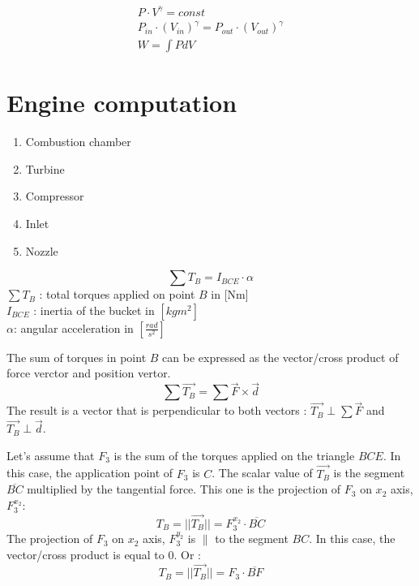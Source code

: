 \documentclass[12pt,a4paper]{article}
\begin{document}
	\begin{eqnarray}
		P \cdot V^{\gamma} = const\\
		P_{in} \cdot (V_{in})^{\gamma} = P_{out} \cdot (V_{out})^{\gamma}\\
		W =\int P dV
	\end{eqnarray}
	
	\section{Engine computation}
	\begin{enumerate}
		\item Combustion chamber
		\item Turbine
		\item Compressor
		\item Inlet
		\item Nozzle
	\end{enumerate}

	
		 
	\newpage
	\begin{equation}
		\sum T_B = I_{BCE} \cdot \alpha
	\end{equation}
	$\sum T_B$ : total torques applied on point $B$ in [Nm]\\
	$I_{BCE}$ : inertia of the bucket in $[kg m^2]$\\
	$\alpha$: angular acceleration in $[\frac{rad}{s^2}] $
	
	The sum of torques in point $B$ can be expressed as the vector/cross product of force verctor and position vertor. 
	\begin{equation}
		\sum \vec{T_B} = \sum \vec{F} \times \vec{d}
	\end{equation}
	The result is a vector that is perpendicular to both vectors : 
	$\vec{T_B} \perp \sum \vec{F}$ and 
	$\vec{T_B} \perp \vec{d}$.
	
	Let's assume that $F_3$ is the sum of the torques applied on the triangle $BCE$. In this case, the application point of $F_3$ is $C$. The scalar value of $\vec{T_B}$ is  the segment $\overline{BC}$ multiplied by the tangential force. This one is the projection of $F_3$ on $x_2$ axis, $F_3^{x_2}$:
	\begin{equation}
		T_B=||\vec{T_B}|| = F_3^{x_2} \cdot \overline{BC}
	\end{equation}
	The projection of $F_3$ on $x_2$ axis, $F_3^{y_2}$ is $\parallel$ to the segment $BC$. In this case, the vector/cross product is equal to $0$.
	Or : 
	\begin{equation}
		T_B=||\vec{T_B}|| = F_3 \cdot \overline{BF}
	\end{equation}
	
\end{document}
